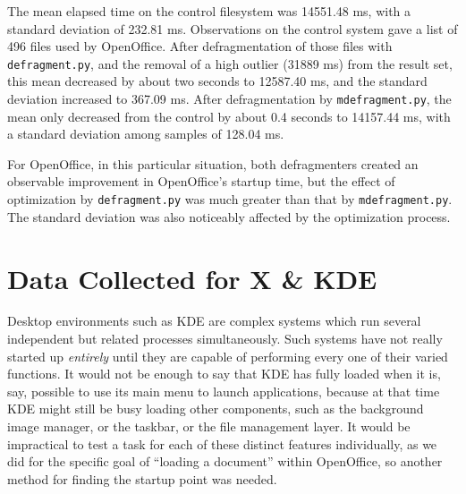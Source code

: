 \documentclass[10pt,twocolumn,letterpaper]{article}
\begin{document}
The mean elapsed time on the control filesystem was 14551.48 ms, with a standard deviation of 232.81 ms. Observations on the control system gave a list of 496 files used by OpenOffice. After
defragmentation of those files with \texttt{defragment.py}, and the removal of a high outlier (31889 ms) from the result set, this mean decreased by about two seconds to 12587.40 ms, and the standard deviation increased to 367.09 ms. After defragmentation by \texttt{mdefragment.py}, the mean only decreased from the control by about 0.4 seconds to 14157.44 ms, with a standard deviation among samples of 128.04 ms.

For OpenOffice, in this particular situation, both defragmenters created an observable improvement in OpenOffice's startup time, but the effect of optimization by \texttt{defragment.py} was much greater than that by \texttt{mdefragment.py}. The standard deviation was also noticeably affected by the optimization process.

\section{Data Collected for X \& KDE}\label{sec:kderesults}

Desktop environments such as KDE are complex systems which run several independent but related processes simultaneously. Such systems have not really started up \emph{entirely} until they are capable of performing every one of their varied functions. It would not be enough to say that KDE has fully loaded when it is, say, possible to use its main menu to launch applications, because at that time KDE might still be busy loading other components, such as the background image manager, or the taskbar, or the file management layer. It would be impractical to test a task for each of these distinct features individually, as we did for the specific goal of ``loading a document'' within OpenOffice, so another method for finding the startup point was needed.
\end{document}
